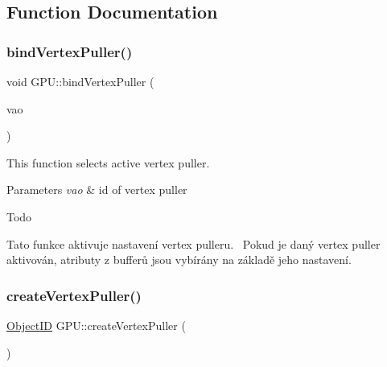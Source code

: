 \subsection{Function Documentation}
\mbox{\label{group__vertexpuller__tasks_gac7f9799e1a6a3b1cafb5f4c4c5e9555d}} 
\subsubsection{\texorpdfstring{bind\+Vertex\+Puller()}{bindVertexPuller()}}
{\footnotesize\ttfamily void G\+P\+U\+::bind\+Vertex\+Puller (\begin{DoxyParamCaption}\item[{\hyperlink{fwd_8hpp_af6f78f73099477c9ce5537d657597486}{Vertex\+Puller\+ID}}]{vao }\end{DoxyParamCaption})}



This function selects active vertex puller. 


\begin{DoxyParams}{Parameters}
{\em vao} & id of vertex puller \\
\hline
\end{DoxyParams}
\begin{DoxyRefDesc}{Todo}
\item[\hyperlink{todo__todo000014}{Todo}]Tato funkce aktivuje nastavení vertex pulleru.~\newline
 Pokud je daný vertex puller aktivován, atributy z bufferů jsou vybírány na základě jeho nastavení.~\newline
 \end{DoxyRefDesc}
\mbox{\label{group__vertexpuller__tasks_gaabe965c10fea7cd8f8af3aa528915c92}} 
\subsubsection{\texorpdfstring{create\+Vertex\+Puller()}{createVertexPuller()}}
{\footnotesize\ttfamily \hyperlink{fwd_8hpp_af56aa505d50bcd62e9e9c5a72564af4d}{Object\+ID} G\+P\+U\+::create\+Vertex\+Puller (\begin{DoxyParamCaption}{ }\end{DoxyParamCaption})}



